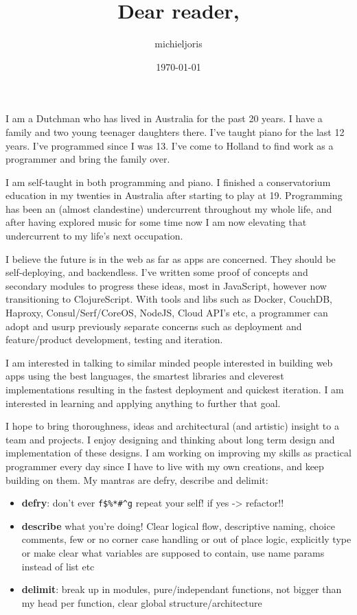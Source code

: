 \documentclass[11pt]{article}
\title{Dear reader,}
\author{michieljoris}
\date{\today}
\begin{document}
\maketitle


I am a Dutchman who has lived in Australia for the past 20 years. I have a family and two young teenager daughters there. I've taught piano for the last 12 years. I've programmed since I was 13. I've come to Holland to find work as a programmer and bring the family over. 

I am self-taught in both programming and piano. I finished a conservatorium education in my twenties in Australia after starting to play at 19. Programming has been an (almost clandestine) undercurrent throughout my whole life, and after having explored music for some time now I am now elevating that undercurrent to my life's next occupation. 

I believe the future is in the web as far as apps are concerned. They should be self-deploying, and backendless. I've written some proof of concepts and secondary modules to progress these ideas, most in JavaScript, however now transitioning to ClojureScript. With tools and libs such as Docker, CouchDB, Haproxy, Consul/Serf/CoreOS, NodeJS, Cloud API's  etc, a programmer can adopt and usurp previously separate concerns such as deployment and feature/product development, testing and iteration. 

I am interested in talking to similar minded people interested in building web apps using the best languages, the smartest libraries and cleverest implementations resulting in the fastest deployment and quickest iteration. I am interested in learning and applying anything to further that goal. 

I hope to bring thoroughness, ideas and architectural (and artistic) insight to a team and projects. I enjoy designing and thinking about long term design and implementation of these designs. I am working on improving my skills as practical programmer every day since I have to live with my own creations, and keep building on them. My mantras are defry, describe and delimit:
\vspace{3mm} %
\renewcommand{\labelitemi}{\textbullet}

\begin{itemize}
\item \textbf{defry}: don't ever \verb~f$%*#^g~ repeat your self!
   if yes -> refactor!!
\item \textbf{describe} what you're doing!
   Clear logical flow, descriptive naming, choice comments, few or no corner case handling or out of place logic, explicitly type or make clear what variables are supposed to contain, use name params instead of list etc
\item \textbf{delimit}: break up in modules, pure/independant functions, not bigger than my head per function, clear global structure/architecture
\end{itemize}
\end{document}
